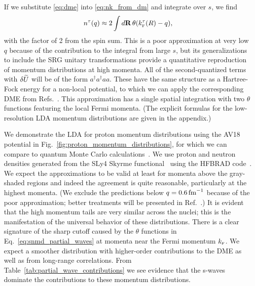 \documentclass[10pt,aps,prc,floatfix,twocolumn,nofootinbib]{revtex4-1}
\begin{document}
If we substitute \eqref{eq:dme} into \eqref{eq:nk_from_dm} and integrate over $s$, we find
%
\begin{align}
    n^\tau(q) \approx 2 \int d\mathbf{R}\, \theta(k_{\scriptscriptstyle{\text F}}^\tau(R) - q),
\end{align}
%
with the factor of 2 from the spin sum.
This is a poor approximation at very low $q$ because of the contribution to the integral from large $s$,
but its generalizations to include the SRG unitary transformations provide a quantitative
reproduction of momentum distributions at high momenta.  
All of the second-quantized terms with $\delta \widetilde U$ will be of the form $a^\dagger a^\dagger a a$. 
These have the same structure as a Hartree-Fock energy for a non-local potential, to which we can apply the corresponding DME from Refs.~\cite{Negele:1972zp,Bogner:2008kj}.
This approximation has a single spatial integration with two $\theta$ functions featuring the local Fermi momenta.
(The explicit formulas for the low-resolution LDA momentum distributions are given in the appendix.)

We demonstrate the LDA for proton momentum distributions using the AV18 potential in Fig.~\ref{fig:proton_momentum_distributions}, for which we can compare to quantum Monte Carlo calculations~\cite{Wiringa:2013ala,Lonardoni:2017egu,Wiringa:single_distributions}.
We use proton and neutron densities generated from the SLy4 Skyrme functional~\cite{Chabanat:1997un} using the HFBRAD code~\cite{Bennaceur:2005mx}.
We expect the approximations to be valid at least for momenta above the gray-shaded regions and indeed the agreement is quite reasonable, particularly at the highest momenta.
(We exclude the predictions below $q = 0.6\,\mbox{fm}^{-1}$ because of the poor approximation; better treatments will be presented in Ref.~\cite{Tropiano:2021prep}.)
It is evident that the high momentum tails are very similar across the nuclei; this is the manifestation of the universal behavior of these distributions.
There is a clear signature of the sharp cutoff caused by the $\theta$ functions in Eq.~\eqref{eq:snmd_partial_waves} at momenta near the Fermi momentum $k_{\scriptscriptstyle{\text F}}$.
We expect a smoother distribution with higher-order contributions to the DME as well as from long-range correlations.
From Table~\ref{tab:partial_wave_contributions} we see evidence that the s-waves dominate the contributions to these momentum distributions.
\end{document}
